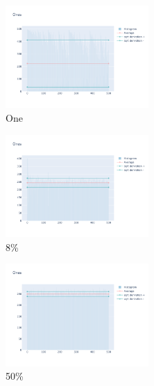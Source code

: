 \documentclass[12pt, fleqn]{report}                             %
\theoremstyle{break}                                            %
\begin{document}
      \begin{figure}[ht!]
        \centering
        \begin{subfigure}[b]{0.4\linewidth}
          \includegraphics[width=0.6\textwidth]{Images/105/dia-a.png}
          \caption{One}
        \end{subfigure}
        \begin{subfigure}[b]{0.4\linewidth}
          \includegraphics[width=0.6\textwidth]{Images/105/dia-b.png}
          \caption{8\%}
        \end{subfigure}
        \begin{subfigure}[b]{0.4\linewidth}
          \includegraphics[width=0.6\textwidth]{Images/105/dia-c.png}
          \caption{50\%}
        \end{subfigure}
        \begin{subfigure}[b]{0.4\linewidth}

\end{subfigure}
\end{figure}
\end{document}
